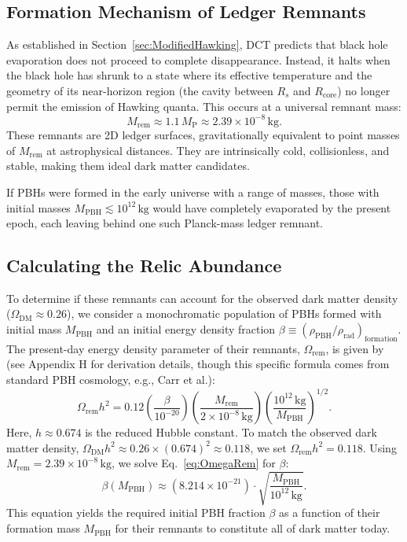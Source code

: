 \documentclass[a4paper, 12pt, oneside]{book}
\numberwithin{equation}{chapter}
\begin{document}
\subsection{Formation Mechanism of Ledger Remnants}
\label{ssec:RemnantFormation}

As established in Section~\ref{sec:ModifiedHawking}, DCT predicts that black hole evaporation does not proceed to complete disappearance. Instead, it halts when the black hole has shrunk to a state where its effective temperature and the geometry of its near-horizon region (the cavity between $R_s$ and $R_{\text{core}}$) no longer permit the emission of Hawking quanta. This occurs at a universal remnant mass:
\[
    M_{\text{rem}} \approx 1.1\,M_{\mathrm{P}} \approx 2.39 \times 10^{-8}\,\mathrm{kg}.
\]
These remnants are 2D ledger surfaces, gravitationally equivalent to point masses of $M_{\text{rem}}$ at astrophysical distances. They are intrinsically cold, collisionless, and stable, making them ideal dark matter candidates.

If PBHs were formed in the early universe with a range of masses, those with initial masses $M_{\text{PBH}} \lesssim 10^{12}\,\mathrm{kg}$ would have completely evaporated by the present epoch, each leaving behind one such Planck-mass ledger remnant.

\subsection{Calculating the Relic Abundance}
\label{ssec:RelicAbundanceCalc}

To determine if these remnants can account for the observed dark matter density ($\Omega_{\text{DM}} \approx 0.26$), we consider a monochromatic population of PBHs formed with initial mass $M_{\text{PBH}}$ and an initial energy density fraction $\beta \equiv (\rho_{\text{PBH}}/\rho_{\text{rad}})_{\text{formation}}$. The present-day energy density parameter of their remnants, $\Omega_{\text{rem}}$, is given by (see Appendix H for derivation details, though this specific formula comes from standard PBH cosmology, e.g., Carr et al.):
\[
    \Omega_{\text{rem}}h^2 = 0.12 \left(\frac{\beta}{10^{-20}}\right) \left(\frac{M_{\text{rem}}}{2 \times 10^{-8}\,\mathrm{kg}}\right) \left(\frac{10^{12}\,\mathrm{kg}}{M_{\text{PBH}}}\right)^{1/2}.
    \label{eq:OmegaRem}
\]
Here, $h \approx 0.674$ is the reduced Hubble constant. To match the observed dark matter density, $\Omega_{\text{DM}}h^2 \approx 0.26 \times (0.674)^2 \approx 0.118$, we set $\Omega_{\text{rem}}h^2 = 0.118$. Using $M_{\text{rem}} = 2.39 \times 10^{-8}\,\mathrm{kg}$, we solve Eq.~\eqref{eq:OmegaRem} for $\beta$:
\[
    \beta(M_{\text{PBH}}) \approx (8.214 \times 10^{-21}) \cdot \sqrt{\frac{M_{\text{PBH}}}{10^{12}\,\mathrm{kg}}}.
    \label{eq:betaMPBH}
\]
This equation yields the required initial PBH fraction $\beta$ as a function of their formation mass $M_{\text{PBH}}$ for their remnants to constitute all of dark matter today.
\end{document}
